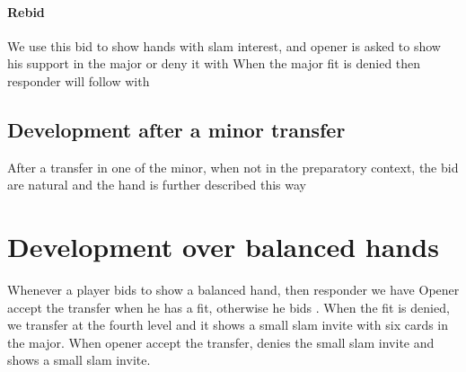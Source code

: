\paragraph{\bid{2\NT} Rebid}
We use this bid to show hands with slam interest, and opener is asked to show his support in the major or deny it with
When the major fit is denied then responder will follow with
\subsection{Development after a minor transfer}
After a transfer in one of the minor, when not in the preparatory context, the bid are natural and the hand is further described this way
\section{Development over \bid{2\NT} balanced hands}
Whenever a player bids \bid{2\NT} to show a balanced hand, then responder we have
Opener accept the transfer when he has a fit, otherwise he bids \bid{3\NT}. When the fit is denied, we transfer at the fourth level and it shows a small slam invite with six cards in the major. When opener accept the transfer, \bid{3\NT} denies the small slam invite and  shows a small slam invite.

